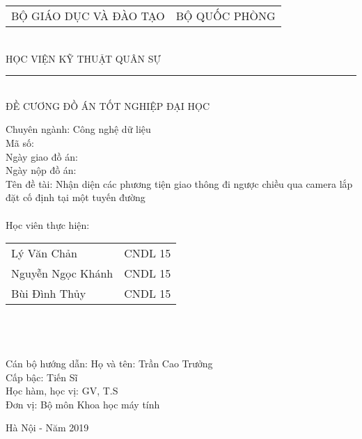 \begin{center}
\vfill
\begin{tabular*}{0.8\linewidth}{@{\extracolsep{\fill}}cc}
	\large BỘ GIÁO DỤC VÀ ĐÀO TẠO  & \large BỘ QUỐC PHÒNG \\
\end{tabular*}
\\
\large HỌC VIỆN KỸ THUẬT QUÂN SỰ
\\
\rule{200px}{1px}\\
ĐỀ CƯƠNG ĐỒ ÁN TỐT NGHIỆP ĐẠI HỌC \\

\end{center}
\vfill
Chuyên ngành: Công nghệ dữ liệu\\
Mã số:\\
Ngày giao đồ án:\\
Ngày nộp đồ án:\\
Tên đề tài: Nhận diện các phương tiện giao thông đi ngược chiều qua camera lắp đặt cố định tại một tuyến đường\\ \\
Học viên thực hiện:
\smallbreak
\begin{tabularx}{\linewidth}{l l}
	 Lý Văn Chản  & CNDL 15\\
	 Nguyễn Ngọc Khánh  & CNDL 15\\
	 Bùi Đình Thủy  &  CNDL 15\\
\end{tabularx}\\\\\\
Cán bộ hướng dẫn:
Họ và tên: Trần Cao Trưởng\\
Cấp bậc: Tiến Sĩ\\
Học hàm, học vị: GV, T.S\\
Đơn vị: Bộ môn Khoa học máy tính

\vfill
\begin{center}
Hà Nội - Năm 2019
\end{center}

